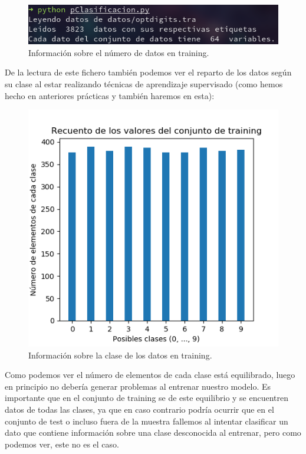 \documentclass[12pt, spanish]{article}
\begin{document}
\begin{figure}[H]
	\centering
	\includegraphics[scale=0.7]{clasificacion/num_datos.png}
	\caption{Información sobre el número de datos en training.}
	\label{datosClasificacion}
\end{figure}

De la lectura de este fichero también podemos ver el reparto de los datos según su clase al estar realizando técnicas de aprendizaje supervisado (como hemos hecho en anteriores prácticas y también haremos en esta):

\begin{figure}[H]
	\centering
	\includegraphics[scale=1]{clasificacion/datos_tra.png}
	\caption{Información sobre la clase de los datos en training.}
	\label{claseDatosClasificacion}
\end{figure}

Como podemos ver el número de elementos de cada clase está equilibrado, luego en principio no debería generar problemas al entrenar nuestro modelo. Es importante que en el conjunto de training se de este equilibrio y se encuentren datos de todas las clases, ya que en caso contrario podría ocurrir que en el conjunto de test o incluso fuera de la muestra fallemos al intentar clasificar un dato que contiene información sobre una clase desconocida al entrenar, pero como podemos ver, este no es el caso.
\end{document}
